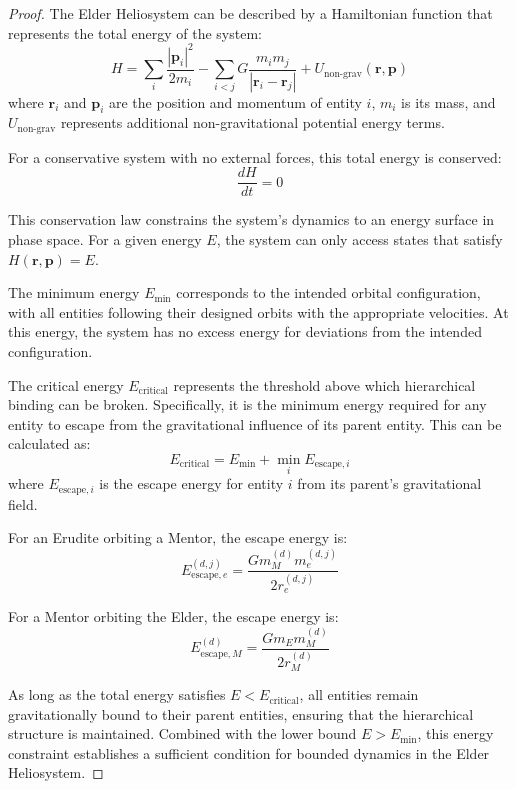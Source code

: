 \begin{proof}
The Elder Heliosystem can be described by a Hamiltonian function that represents the total energy of the system:
\begin{equation}
H = \sum_i \frac{|\mathbf{p}_i|^2}{2m_i} - \sum_{i < j} G \frac{m_i m_j}{|\mathbf{r}_i - \mathbf{r}_j|} + U_{\text{non-grav}}(\mathbf{r}, \mathbf{p})
\end{equation}
where $\mathbf{r}_i$ and $\mathbf{p}_i$ are the position and momentum of entity $i$, $m_i$ is its mass, and $U_{\text{non-grav}}$ represents additional non-gravitational potential energy terms.

For a conservative system with no external forces, this total energy is conserved:
\begin{equation}
\frac{dH}{dt} = 0
\end{equation}

This conservation law constrains the system's dynamics to an energy surface in phase space. For a given energy $E$, the system can only access states that satisfy $H(\mathbf{r}, \mathbf{p}) = E$.

The minimum energy $E_{\text{min}}$ corresponds to the intended orbital configuration, with all entities following their designed orbits with the appropriate velocities. At this energy, the system has no excess energy for deviations from the intended configuration.

The critical energy $E_{\text{critical}}$ represents the threshold above which hierarchical binding can be broken. Specifically, it is the minimum energy required for any entity to escape from the gravitational influence of its parent entity. This can be calculated as:
\begin{equation}
E_{\text{critical}} = E_{\text{min}} + \min_{i} E_{\text{escape},i}
\end{equation}
where $E_{\text{escape},i}$ is the escape energy for entity $i$ from its parent's gravitational field.

For an Erudite orbiting a Mentor, the escape energy is:
\begin{equation}
E_{\text{escape},e}^{(d,j)} = \frac{Gm_M^{(d)}m_e^{(d,j)}}{2r_e^{(d,j)}}
\end{equation}

For a Mentor orbiting the Elder, the escape energy is:
\begin{equation}
E_{\text{escape},M}^{(d)} = \frac{Gm_E m_M^{(d)}}{2r_M^{(d)}}
\end{equation}

As long as the total energy satisfies $E < E_{\text{critical}}$, all entities remain gravitationally bound to their parent entities, ensuring that the hierarchical structure is maintained. Combined with the lower bound $E > E_{\text{min}}$, this energy constraint establishes a sufficient condition for bounded dynamics in the Elder Heliosystem.
\end{proof}


